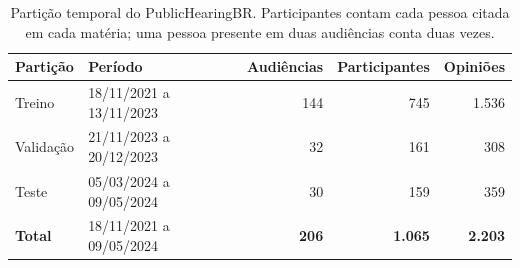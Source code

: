 \begin{table}[H]
  \centering
  \caption{Partição temporal do PublicHearingBR. Participantes contam cada pessoa citada em cada
  matéria; uma pessoa presente em duas audiências conta duas vezes.}
  \label{tab:dados}
  \small
  \begin{tabular}{llrrr}
    \toprule
    \textbf{Partição} & \textbf{Período} & \textbf{Audiências} & \textbf{Participantes} & \textbf{Opiniões} \\
    \midrule
    Treino    & 18/11/2021 a 13/11/2023 & 144 & 745 & 1.536 \\
    Validação & 21/11/2023 a 20/12/2023 &  32 & 161 &   308 \\
    Teste     & 05/03/2024 a 09/05/2024 &  30 & 159 &   359 \\
    \midrule
    \textbf{Total} & 18/11/2021 a 09/05/2024 & \textbf{206} & \textbf{1.065} & \textbf{2.203} \\
    \bottomrule
  \end{tabular}
\end{table}
